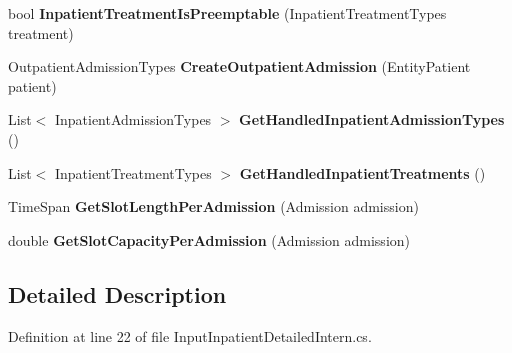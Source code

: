 \begin{DoxyCompactItemize}
\item 
bool {\bfseries Inpatient\+Treatment\+Is\+Preemptable} (Inpatient\+Treatment\+Types treatment)\hypertarget{class_general_health_elements_1_1_input_output_1_1_inpatient_1_1_input_inpatient_detailed_intern_aa047c577efa2afc29c0996174f04115c}{}\label{class_general_health_elements_1_1_input_output_1_1_inpatient_1_1_input_inpatient_detailed_intern_aa047c577efa2afc29c0996174f04115c}

\item 
Outpatient\+Admission\+Types {\bfseries Create\+Outpatient\+Admission} (Entity\+Patient patient)\hypertarget{class_general_health_elements_1_1_input_output_1_1_inpatient_1_1_input_inpatient_detailed_intern_ab02e1161f755bd3e435f91a6b046be37}{}\label{class_general_health_elements_1_1_input_output_1_1_inpatient_1_1_input_inpatient_detailed_intern_ab02e1161f755bd3e435f91a6b046be37}

\item 
List$<$ Inpatient\+Admission\+Types $>$ {\bfseries Get\+Handled\+Inpatient\+Admission\+Types} ()\hypertarget{class_general_health_elements_1_1_input_output_1_1_inpatient_1_1_input_inpatient_detailed_intern_a5c2b3edbc832a4e41e4e237f7ff02228}{}\label{class_general_health_elements_1_1_input_output_1_1_inpatient_1_1_input_inpatient_detailed_intern_a5c2b3edbc832a4e41e4e237f7ff02228}

\item 
List$<$ Inpatient\+Treatment\+Types $>$ {\bfseries Get\+Handled\+Inpatient\+Treatments} ()\hypertarget{class_general_health_elements_1_1_input_output_1_1_inpatient_1_1_input_inpatient_detailed_intern_a23888560386fd9167460e9c5041f28b3}{}\label{class_general_health_elements_1_1_input_output_1_1_inpatient_1_1_input_inpatient_detailed_intern_a23888560386fd9167460e9c5041f28b3}

\item 
Time\+Span {\bfseries Get\+Slot\+Length\+Per\+Admission} (Admission admission)\hypertarget{class_general_health_elements_1_1_input_output_1_1_inpatient_1_1_input_inpatient_detailed_intern_a57d5f8c587f92c5ee6dcd8fb26e52a65}{}\label{class_general_health_elements_1_1_input_output_1_1_inpatient_1_1_input_inpatient_detailed_intern_a57d5f8c587f92c5ee6dcd8fb26e52a65}

\item 
double {\bfseries Get\+Slot\+Capacity\+Per\+Admission} (Admission admission)\hypertarget{class_general_health_elements_1_1_input_output_1_1_inpatient_1_1_input_inpatient_detailed_intern_a9961a5623285d91206efb4bb5672ab92}{}\label{class_general_health_elements_1_1_input_output_1_1_inpatient_1_1_input_inpatient_detailed_intern_a9961a5623285d91206efb4bb5672ab92}

\end{DoxyCompactItemize}


\subsection{Detailed Description}


Definition at line 22 of file Input\+Inpatient\+Detailed\+Intern.\+cs.

